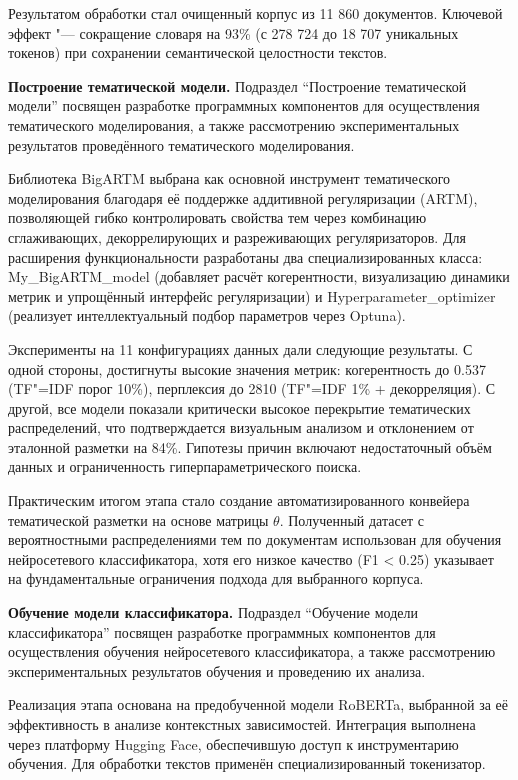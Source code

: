 \documentclass[autoref]{SCWorks}
\begin{document}
Результатом обработки стал очищенный корпус из 11 860 документов. Ключевой
эффект "--- сокращение словаря на 93\% (с 278 724 до 18 707 уникальных токенов)
при сохранении семантической целостности текстов.

\textbf{Построение тематической модели.}
Подраздел \enquote{Построение тематической модели} посвящен разработке
программных компонентов для осуществления тематического моделирования, а также
рассмотрению экспериментальных результатов проведённого тематического
моделирования. 

Библиотека BigARTM выбрана как основной инструмент тематического
моделирования благодаря её поддержке аддитивной регуляризации (ARTM),
позволяющей гибко контролировать свойства тем через комбинацию сглаживающих,
декоррелирующих и разреживающих регуляризаторов. Для расширения функциональности
разработаны два специализированных класса:\\My\_BigARTM\_model (добавляет расчёт
когерентности, визуализацию динамики метрик и упрощённый интерфейс
регуляризации) и Hyperparameter\_optimizer (реализует интеллектуальный подбор
параметров через Optuna).

Эксперименты на 11 конфигурациях данных дали следующие результаты. С
одной стороны, достигнуты высокие значения метрик: когерентность до 0.537
(TF"=IDF порог 10\%), перплексия до 2810 (TF"=IDF 1\% + декорреляция). С другой,
все модели показали критически высокое перекрытие тематических распределений,
что подтверждается визуальным анализом и отклонением от эталонной разметки на
84\%. Гипотезы причин включают недостаточный объём данных и ограниченность
гиперпараметрического поиска.

Практическим итогом этапа стало создание автоматизированного конвейера
тематической разметки на основе матрицы $\theta$. Полученный датасет с
вероятностными распределениями тем по документам использован для обучения
нейросетевого классификатора, хотя его низкое качество (F1 < 0.25) указывает на
фундаментальные ограничения подхода для выбранного корпуса.

\textbf{Обучение модели классификатора.}
Подраздел \enquote{Обучение модели классификатора} посвящен разработке
программных компонентов для осуществления обучения нейросетевого классификатора,
а также рассмотрению экспериментальных результатов обучения и проведению их
анализа.

Реализация этапа основана на предобученной модели RoBERTa, выбранной за её
эффективность в анализе контекстных зависимостей. Интеграция выполнена через
платформу Hugging Face, обеспечившую доступ к инструментарию обучения. Для
обработки текстов применён специализированный токенизатор.
\end{document}
